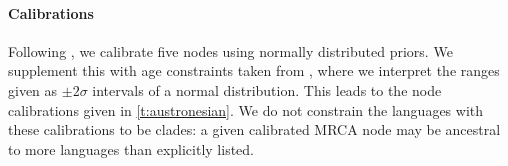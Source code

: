 \documentclass[]{rsos}%
\begin{document}
\paragraph{Calibrations}
\newcommand{\abvd}[2]{#1 [\href{https://abvd.shh.mpg.de/austronesian/language.php?id=#2}{#2}]}
Following \textcite{greenhill2017evolutionary}, we calibrate five nodes using normally
distributed priors. We supplement this with age constraints taken from \textcite[Table S3]{gray2009language}, where we interpret the ranges given as $\pm 2\sigma$ intervals of a normal distribution. This leads to the node calibrations given in \cref{t:austronesian}. We do not constrain the languages with these calibrations to be clades: a given calibrated MRCA node may be ancestral to more languages than explicitly listed.
\end{document}
